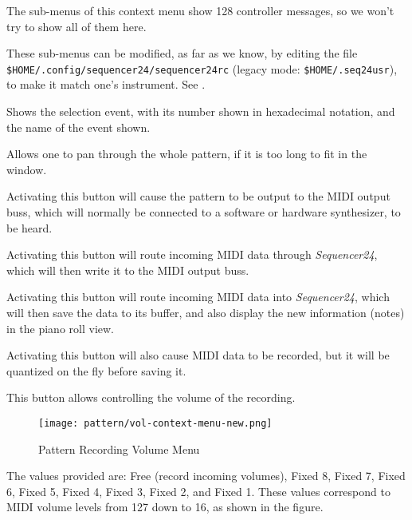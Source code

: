    The sub-menus of this context menu show 128 controller messages,
   so we won't try to show all of them here.

   These sub-menus can be modified, as far as we know, by editing
   the file \texttt{\$HOME/.config/sequencer24/sequencer24rc}
   (legacy mode: \texttt{\$HOME/.seq24usr}), to make it match one's
   instrument.  See .

   Shows the selection event, with its number shown in hexadecimal notation,
   and the name of the event shown.

   Allows one to pan through the whole pattern, if it is too long to fit in
   the window.

   Activating this button will cause the pattern to be output to the MIDI
   output buss, which will normally be connected to a software or hardware
   synthesizer, to be heard.

   Activating this button will route incoming MIDI data through
   \textsl{Sequencer24}, which will then write it to the MIDI output buss.

   Activating this button will route incoming MIDI data into
   \textsl{Sequencer24}, which will then save the data to its buffer, and also
   display the new information (notes) in the piano roll view.

   Activating this button will also cause MIDI data to be recorded, but it
   will be quantized on the fly before saving it.

   This button allows controlling the volume of the recording.

\begin{figure}[H]
   \centering 
   \texttt{[image: pattern/vol-context-menu-new.png]}
   \caption{Pattern Recording Volume Menu}
   \label{fig:pattern_edit_recording_volume_menu}
\end{figure}

   The values provided are:
   Free (record incoming volumes),
   Fixed 8, Fixed 7, Fixed 6, Fixed 5, Fixed 4, Fixed 3,
   Fixed 2, and Fixed 1.
   These values correspond to MIDI volume levels from 127 down to 16, as
   shown in the figure.


